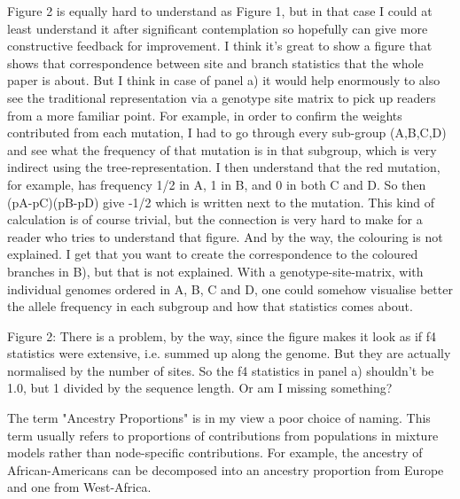 \begin{point}{}
Figure 2 is equally hard to understand as Figure 1, but in that case I could at least understand it after significant contemplation so hopefully can give more constructive feedback for improvement. I think it's great to show a figure that shows that correspondence between site and branch statistics that the whole paper is about. But I think in case of panel a) it would help enormously to also see the traditional representation via a genotype site matrix to pick up readers from a more familiar point. For example, in order to confirm the weights contributed from each mutation, I had to go through every sub-group (A,B,C,D) and see what the frequency of that mutation is in that subgroup, which is very indirect using the tree-representation. I then understand that the red mutation, for example, has frequency 1/2 in A, 1 in B, and 0 in both C and D. So then (pA-pC)(pB-pD) give -1/2 which is written next to the mutation. This kind of calculation is of course trivial, but the connection is very hard to make for a reader who tries to understand that figure. And by the way, the colouring is not explained. I get that you want to create the correspondence to the coloured branches in B), but that is not explained. With a genotype-site-matrix, with individual genomes ordered in A, B, C and D, one could somehow visualise better the allele frequency in each subgroup and how that statistics comes about.
\end{point}

\reply{
}

\begin{point}{Figure 2:}
There is a problem, by the way, since the figure makes it look as if f4 statistics were extensive, i.e. summed up along the genome. But they are actually normalised by the number of sites. So the f4 statistics in panel a) shouldn't be 1.0, but 1 divided by the sequence length. Or am I missing something?
\end{point}

\reply{
}



\begin{point}{\revref}
        The term "Ancestry Proportions" is in my view a poor choice of naming. This term usually refers to proportions of contributions from populations in mixture models rather than node-specific contributions. For example, the ancestry of African-Americans can be decomposed into an ancestry proportion from Europe and one from West-Africa.
\end{point}


